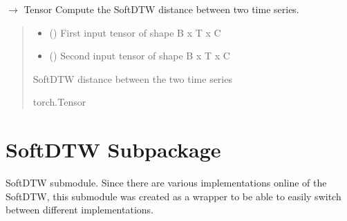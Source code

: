 \documentclass[letterpaper,10pt,english]{sphinxmanual}
\begin{document}
\begin{fulllineitems}
\begin{fulllineitems}
\label{\detokenize{dtw_loss_functions.soft_dtw:dtw_loss_functions.soft_dtw.soft_dtw.forward}}
\pysigstartsignatures
\pysiglinewithargsret
{}
{\sphinxparamcomma {}}
{{ $\rightarrow$ Tensor}}
\pysigstopsignatures
\sphinxAtStartPar
Compute the SoftDTW distance between two time series.
\begin{quote}\begin{description}
\begin{itemize}
\item {} 
\sphinxAtStartPar
{} () \textendash{} First input tensor of shape B x T x C

\item {} 
\sphinxAtStartPar
{} () \textendash{} Second input tensor of shape B x T x C

\end{itemize}

\sphinxAtStartPar
SoftDTW distance between the two time series

\sphinxAtStartPar
torch.Tensor

\end{description}\end{quote}

\end{fulllineitems}


\end{fulllineitems}


\sphinxstepscope


\chapter{SoftDTW Subpackage}
\label{\detokenize{dtw_loss_functions.soft_dtw_implementations:module-dtw_loss_functions.soft_dtw_implementations}}\label{\detokenize{dtw_loss_functions.soft_dtw_implementations:softdtw-subpackage}}\label{\detokenize{dtw_loss_functions.soft_dtw_implementations::doc}}
\sphinxAtStartPar
SoftDTW submodule. Since there are various implementations online of the SoftDTW, this submodule was created as a wrapper to be able to easily switch between different implementations.
\end{document}
